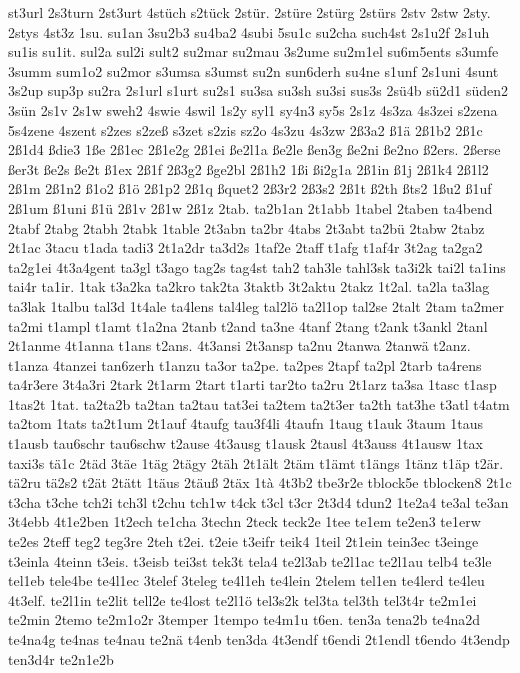 {st3url
2s3turn
2st3urt
4stüch
s2tück
2stür.
2stüre
2stürg
2stürs
2stv
2stw
2sty.
2stys
4st3z
1su.
su1an
3su2b3
su4ba2
4subi
5su1c
su2cha
such4st
2s1u2f
2s1uh
su1is
su1it.
sul2a
sul2i
sult2
su2mar
su2mau
3s2ume
su2m1el
su6m5ents
s3umfe
3summ
sum1o2
su2mor
s3umsa
s3umst
su2n
sun6derh
su4ne
s1unf
2s1uni
4sunt
3s2up
sup3p
su2ra
2s1url
s1urt
su2s1
su3sa
su3sh
su3si
sus3s
2sü4b
sü2d1
süden2
3sün
2s1v
2s1w
sweh2
4swie
4swil
1s2y
syl1
sy4n3
sy5s
2s1z
4s3za
4s3zei
s2zena
5s4zene
4szent
s2zes
s2zeß
s3zet
s2zis
sz2o
4s3zu
4s3zw
2ß3a2
ß1ä
2ß1b2
2ß1c
2ß1d4
ßdie3
1ße
2ß1ec
2ß1e2g
2ß1ei
ße2l1a
ße2le
ßen3g
ße2ni
ße2no
ß2ers.
2ßerse
ßer3t
ße2s
ße2t
ß1ex
2ß1f
2ß3g2
ßge2bl
2ß1h2
1ßi
ßi2g1a
2ß1in
ß1j
2ß1k4
2ß1l2
2ß1m
2ß1n2
ß1o2
ß1ö
2ß1p2
2ß1q
ßquet2
2ß3r2
2ß3s2
2ß1t
ß2th
ßts2
1ßu2
ß1uf
2ß1um
ß1uni
ß1ü
2ß1v
2ß1w
2ß1z
2tab.
ta2b1an
2t1abb
1tabel
2taben
ta4bend
2tabf
2tabg
2tabh
2tabk
1table
2t3abn
ta2br
4tabs
2t3abt
ta2bü
2tabw
2tabz
2t1ac
3tacu
t1ada
tadi3
2t1a2dr
ta3d2s
1taf2e
2taff
t1afg
t1af4r
3t2ag
ta2ga2
ta2g1ei
4t3a4gent
ta3gl
t3ago
tag2s
tag4st
tah2
tah3le
tahl3sk
ta3i2k
tai2l
ta1ins
tai4r
ta1ir.
1tak
t3a2ka
ta2kro
tak2ta
3taktb
3t2aktu
2takz
1t2al.
ta2la
ta3lag
ta3lak
1talbu
tal3d
1t4ale
ta4lens
tal4leg
tal2lö
ta2l1op
tal2se
2talt
2tam
ta2mer
ta2mi
t1ampl
t1amt
t1a2na
2tanb
t2and
ta3ne
4tanf
2tang
t2ank
t3ankl
2tanl
2t1anme
4t1anna
t1ans
t2ans.
4t3ansi
2t3ansp
ta2nu
2tanwa
2tanwä
t2anz.
t1anza
4tanzei
tan6zerh
t1anzu
ta3or
ta2pe.
ta2pes
2tapf
ta2pl
2tarb
ta4rens
ta4r3ere
3t4a3ri
2tark
2t1arm
2tart
t1arti
tar2to
ta2ru
2t1arz
ta3sa
1tasc
t1asp
1tas2t
1tat.
ta2ta2b
ta2tan
ta2tau
tat3ei
ta2tem
ta2t3er
ta2th
tat3he
t3atl
t4atm
ta2tom
1tats
ta2t1um
2t1auf
4taufg
tau3f4li
4taufn
1taug
t1auk
3taum
1taus
t1ausb
tau6schr
tau6schw
t2ause
4t3ausg
t1ausk
2tausl
4t3auss
4t1ausw
1tax
taxi3s
tä1c
2täd
3täe
1täg
2tägy
2täh
2t1ält
2täm
t1ämt
t1ängs
1tänz
t1äp
t2är.
tä2ru
tä2s2
t2ät
2tätt
1täus
2täuß
2täx
1tà
4t3b2
tbe3r2e
tblock5e
tblocken8
2t1c
t3cha
t3che
tch2i
tch3l
t2chu
tch1w
t4ck
t3cl
t3cr
2t3d4
tdun2
1te2a4
te3al
te3an
3t4ebb
4t1e2ben
1t2ech
te1cha
3techn
2teck
teck2e
1tee
te1em
te2en3
te1erw
te2es
2teff
teg2
teg3re
2teh
t2ei.
t2eie
t3eifr
teik4
1teil
2t1ein
tein3ec
t3einge
t3einla
4teinn
t3eis.
t3eisb
tei3st
tek3t
tela4
te2l3ab
te2l1ac
te2l1au
telb4
te3le
tel1eb
tele4be
te4l1ec
3telef
3teleg
te4l1eh
te4lein
2telem
tel1en
te4lerd
te4leu
4t3elf.
te2l1in
te2lit
tell2e
te4lost
te2l1ö
tel3s2k
tel3ta
tel3th
tel3t4r
te2m1ei
te2min
2temo
te2m1o2r
3temper
1tempo
te4m1u
t6en.
ten3a
tena2b
te4na2d
te4na4g
te4nas
te4nau
te2nä
t4enb
ten3da
4t3endf
t6endi
2t1endl
t6endo
4t3endp
ten3d4r
te2n1e2b
}
